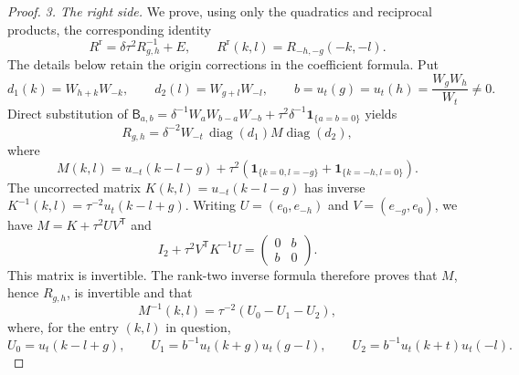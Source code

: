 \documentclass[10pt,a4paper]{amsart}
\newcommand{\ind}[1]{\mathbf1_{\{#1\}}}
\begin{document}
\begin{proof}
\emph{3. The right side.} We prove, using only the quadratics and
reciprocal products, the corresponding identity
\begin{equation}\label{allodd:right-inverse}
 R^{\mathrm r}=\delta\tau^2 R_{g,h}^{-1}+E,
 \qquad
 R^{\mathrm r}(k,l)=R_{-h,-g}(-k,-l).
\end{equation}
The details below retain the origin corrections in the coefficient formula.
Put
\[
 d_1(k)=W_{h+k}W_{-k},\qquad d_2(l)=W_{g+l}W_{-l},
 \qquad b=u_t(g)=u_t(h)=\frac{W_gW_h}{W_t}\ne0.
\]
Direct substitution of
$\mathsf B_{a,b}=\delta^{-1}W_aW_{b-a}W_{-b}
+\tau^2\delta^{-1}\ind{a=b=0}$ yields
\begin{equation}\label{allodd:right-factor}
 R_{g,h}=\delta^{-2}W_{-t}\,
                   \operatorname{diag}(d_1)M\operatorname{diag}(d_2),
\end{equation}
where
\[
 M(k,l)=u_{-t}(k-l-g)
       +\tau^2(\ind{k=0,l=-g}+\ind{k=-h,l=0}).
\]
The uncorrected matrix $K(k,l)=u_{-t}(k-l-g)$ has inverse
$K^{-1}(k,l)=\tau^{-2}u_t(k-l+g)$.
Writing $U=(e_0,e_{-h})$ and $V=(e_{-g},e_0)$, we have
$M=K+\tau^2 UV^{\mathsf T}$ and
\[
 I_2+\tau^2V^{\mathsf T}K^{-1}U=
       \begin{pmatrix}0&b\\b&0\end{pmatrix}.
\]
This matrix is invertible.  The rank-two inverse formula therefore
proves that $M$, hence $R_{g,h}$, is invertible and that
\begin{equation}\label{allodd:woodbury}
 M^{-1}(k,l)=\tau^{-2}(U_0-U_1-U_2),
\end{equation}
where, for the entry $(k,l)$ in question,
\[
 U_0=u_t(k-l+g),\qquad
 U_1=b^{-1}u_t(k+g)u_t(g-l),\qquad
 U_2=b^{-1}u_t(k+t)u_t(-l).
\]


\end{proof}
\end{document}
